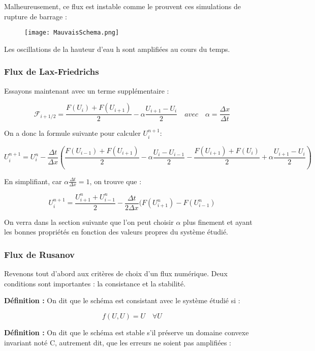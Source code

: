 \documentclass[
11pt, %
francais, %
singlespacing, %
headsepline, %
]{MastersDoctoralThesis} %
\theoremstyle{definition}
\begin{document}
Malheureusement, ce flux est instable comme le prouvent ces simulations de rupture de barrage :

\begin{figure}
\centering
\texttt{[image: MauvaisSchema.png]}
\end{figure}

Les oscillations de la hauteur d'eau h sont amplifiées au cours du temps.

\subsubsection{Flux de Lax-Friedrichs}

Essayons maintenant avec un terme supplémentaire :

$$ \mathcal{F}_{i+1/2} = \frac{F(U_i) + F(U_{i+1})}{2} - \alpha \frac{U_{i+1} - U_i}{2} \quad avec \quad \alpha = \frac{\Delta x}{\Delta t}$$

On a donc la formule suivante pour calculer $U_i ^{n+1}$:

$$ U_i ^{n+1} = U_i ^{n}  - \frac{\Delta t}{\Delta x} ( \frac{F(U_{i-1}) + F(U_{i+1})}{2} - \alpha \frac{U_i - U_{i-1}}{2} - \frac{F(U_{i+1}) + F(U_i)}{2} + \alpha \frac{U_{i+1} - U_i}{2} ) $$

En simplifiant, car $ \alpha \frac{\Delta t}{\Delta x} = 1 $, on trouve que :

$$ U_i ^{n+1} = \frac{U_{i+1} ^{n} + U_{i-1} ^{n}}{2}  - \frac{\Delta t}{2 \Delta x} ( F(U_{i+1} ^n ) - F(U_{i-1} ^n ) $$

On verra dans la section suivante que l'on peut choisir $\alpha$ plus finement et ayant les bonnes propriétés en fonction des valeurs propres du système étudié.

\subsubsection{Flux de Rusanov}

Revenons tout d'abord aux critères de choix d'un flux numérique. Deux conditions sont importantes : la consistance et la stabilité.

\textbf{Définition :} On dit que le schéma est consistant avec le système étudié si :

$$ f(U,U) = U \quad \forall U $$ 

\textbf{Définition :} On dit que le schéma est stable s'il préserve un domaine convexe invariant noté C, autrement dit, que les erreurs ne soient pas amplifiées :
\end{document}
